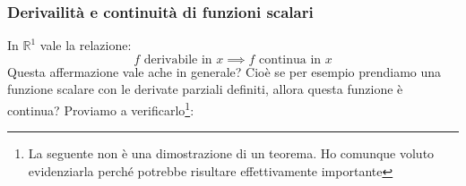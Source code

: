 \subsubsection{Derivailità e continuità di funzioni scalari}
In $\mathbb{R}^1$ vale la relazione:
\begin{equation*}
	f \text{ derivabile in } x \implies f \text{ continua in } x
\end{equation*}
Questa affermazione vale ache in generale? Cioè se per esempio prendiamo una 
funzione scalare con le derivate parziali definiti, allora questa funzione è 
continua? Proviamo a verificarlo\footnote{La seguente non è una dimostrazione 
di un teorema. Ho comunque voluto evidenziarla perché potrebbe risultare 
effettivamente importante}:
